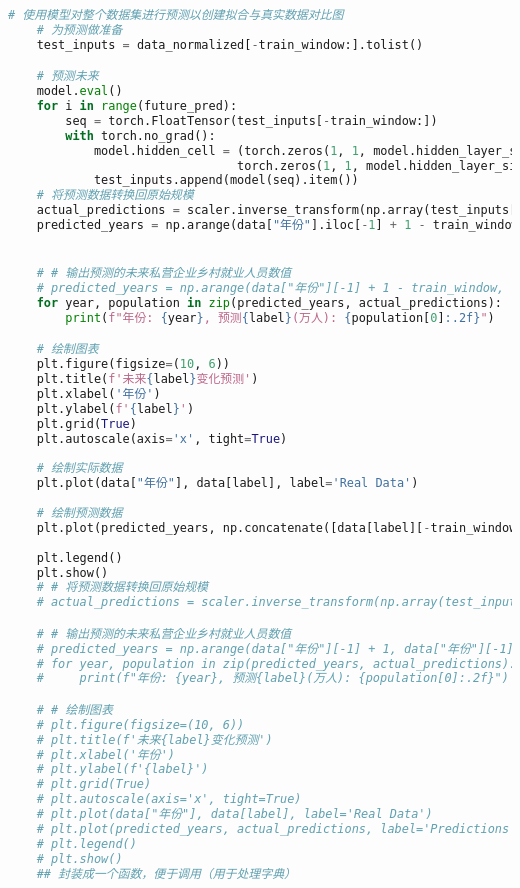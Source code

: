 \begin{lstlisting}[language=python,caption={数字农业渗透}]
    # 使用模型对整个数据集进行预测以创建拟合与真实数据对比图
    # 为预测做准备
    test_inputs = data_normalized[-train_window:].tolist()

    # 预测未来
    model.eval()
    for i in range(future_pred):
        seq = torch.FloatTensor(test_inputs[-train_window:])
        with torch.no_grad():
            model.hidden_cell = (torch.zeros(1, 1, model.hidden_layer_size),
                                torch.zeros(1, 1, model.hidden_layer_size))
            test_inputs.append(model(seq).item())
    # 将预测数据转换回原始规模
    actual_predictions = scaler.inverse_transform(np.array(test_inputs[train_window:]).reshape(-1, 1))
    predicted_years = np.arange(data["年份"].iloc[-1] + 1 - train_window, data["年份"].iloc[-1] + 1 + future_pred)


    # # 输出预测的未来私营企业乡村就业人员数值
    # predicted_years = np.arange(data["年份"][-1] + 1 - train_window, data["年份"][-1] + 1 + future_pred)
    for year, population in zip(predicted_years, actual_predictions):
        print(f"年份: {year}, 预测{label}(万人): {population[0]:.2f}")

    # 绘制图表
    plt.figure(figsize=(10, 6))
    plt.title(f'未来{label}变化预测')
    plt.xlabel('年份')
    plt.ylabel(f'{label}')
    plt.grid(True)
    plt.autoscale(axis='x', tight=True)
    
    # 绘制实际数据
    plt.plot(data["年份"], data[label], label='Real Data')
    
    # 绘制预测数据
    plt.plot(predicted_years, np.concatenate([data[label][-train_window:], actual_predictions.ravel()]), label='Predictions', linestyle='--')
    
    plt.legend()
    plt.show()
    # # 将预测数据转换回原始规模
    # actual_predictions = scaler.inverse_transform(np.array(test_inputs[train_window:]).reshape(-1, 1))

    # # 输出预测的未来私营企业乡村就业人员数值
    # predicted_years = np.arange(data["年份"][-1] + 1, data["年份"][-1] + 1 + future_pred)
    # for year, population in zip(predicted_years, actual_predictions):
    #     print(f"年份: {year}, 预测{label}(万人): {population[0]:.2f}")

    # # 绘制图表
    # plt.figure(figsize=(10, 6))
    # plt.title(f'未来{label}变化预测')
    # plt.xlabel('年份')
    # plt.ylabel(f'{label}')
    # plt.grid(True)
    # plt.autoscale(axis='x', tight=True)
    # plt.plot(data["年份"], data[label], label='Real Data')
    # plt.plot(predicted_years, actual_predictions, label='Predictions', linestyle='--')
    # plt.legend()
    # plt.show()
    ## 封装成一个函数，便于调用（用于处理字典）


\end{lstlisting}
